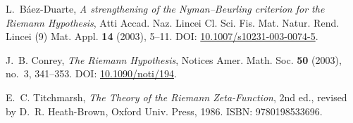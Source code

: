 \documentclass[11pt]{article}
\theoremstyle{remark}
\begin{document}
\begin{thebibliography}{9}
L.~B\'aez-Duarte,
\emph{A strengthening of the Nyman--Beurling criterion for the Riemann Hypothesis},
Atti Accad. Naz. Lincei Cl. Sci. Fis. Mat. Natur. Rend. Lincei (9) Mat. Appl. \textbf{14} (2003), 5--11. 
DOI: \href{https://doi.org/10.1007/s10231-003-0074-5}{10.1007/s10231-003-0074-5}.

J.~B. Conrey,
\emph{The Riemann Hypothesis},
Notices Amer. Math. Soc. \textbf{50} (2003), no.~3, 341--353. 
DOI: \href{https://doi.org/10.1090/noti/194}{10.1090/noti/194}.

E.~C. Titchmarsh,
\emph{The Theory of the Riemann Zeta-Function}, 2nd ed.,
revised by D.~R. Heath-Brown, Oxford Univ. Press, 1986.
ISBN: 9780198533696.
\end{thebibliography}
\end{document}
